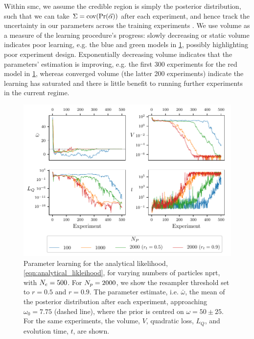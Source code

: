 Within \gls{smc}, we assume the credible region is simply the posterior distribution, 
such that we can take $\Sigma = \textrm{cov}(\Pr(\vec{\alpha}))$ after each experiment, 
and hence track the uncertainty in our parameters across the training \glspl{experiment} \cite{Granade:2012kj}.
We use \gls{volume} as a measure of the learning procedure's progress: 
slowly decreasing or static \gls{volume} indicates poor learning, e.g. the blue and green models in \cref{fig:param_learning_vary_particles}, 
possibly highlighting poor \gls{experiment} design.
Exponentially decreasing \gls{volume} indicates that the parameters' estimation is improving,
e.g. the first 300 \glspl{experiment} for the red model in \cref{fig:param_learning_vary_particles},
whereas converged \gls{volume} (the latter 200 \glspl{experiment})
indicate the learning has saturated and there is little benefit to running further \glspl{experiment} 
in the current regime. 

\begin{figure}[t]
\centering
\includegraphics{algorithms/figures/params.pdf}
\caption[Parameter learning with varying number of particles]{
    Parameter learning for the analytical \gls{likelihood}, \cref{eqn:analytical_likleihood},
    for varying numbers of \glspl{particle} \gls{nprt}, with $N_e=500$. 
    For $N_p=2000$, we show the resampler threshold set to $r=0.5$ and $r=0.9$. 
    The parameter estimate, i.e. $\bar{\omega}$, the mean of the posterior distribution after each experiment, 
    approaching $\omega_0=7.75$ (dashed line), where the prior is centred on $\omega=50 \pm 25$. 
    For the same experiments, the volume, $V$, quadratic loss, $L_Q$, 
    and evolution time, $t$, are shown.
    \figtableref
}
\label{fig:param_learning_vary_particles}
\end{figure}


